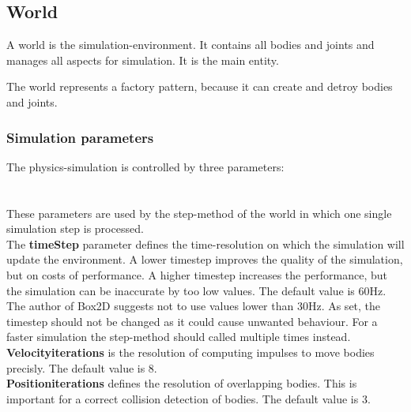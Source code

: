 \documentclass[10pt,a4paper,DIV=11]{scrreprt}
\begin{document}
\subsection{World}
A world is the simulation-environment. It contains all bodies and joints and manages all aspects for simulation. It is the main entity.

The world represents a factory pattern, because it can create and detroy bodies and joints.

\subsubsection*{Simulation parameters}
The physics-simulation is controlled by three parameters: \\

   \\
\\

These parameters are used by the step-method of the world in which one single simulation step is processed. \\

The \textbf{timeStep} parameter defines the time-resolution on which the simulation will update the environment. A lower timestep improves the quality of the simulation, but on costs of performance. A higher timestep increases the performance, but the simulation can be inaccurate by too low values.
The default value is 60Hz. The author of Box2D suggests not to use values lower than 30Hz. As set, the timestep should not be changed as it could cause unwanted behaviour. For a faster simulation the step-method should called multiple times instead. \\


\textbf{Velocityiterations} is the resolution of computing impulses to move bodies precisly. The default value is 8. \\

\textbf{Positioniterations} defines the resolution of overlapping bodies. This is important for a correct collision detection of bodies. The default value is 3. \\
\end{document}
